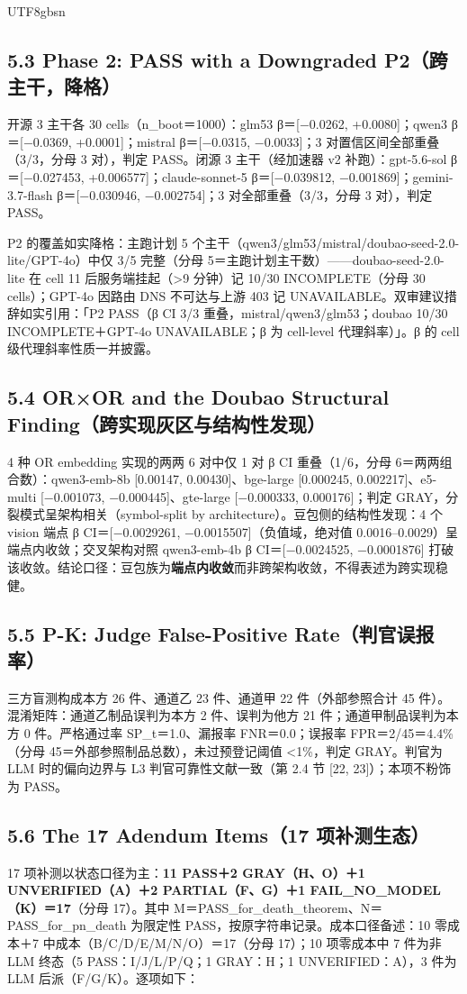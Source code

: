 \documentclass[10pt,a4paper]{article}
\begin{document}
\begin{CJK}{UTF8}{gbsn}
\subsection*{5.3 Phase 2: PASS with a Downgraded P2（跨主干，降格）}开源 3 主干各 30 cells（n\_boot＝1000）：glm53 β＝[−0.0262, +0.0080]；qwen3 β＝[−0.0369, +0.0001]；mistral β＝[−0.0315, −0.0033]；3 对置信区间全部重叠（3/3，分母 3 对），判定 PASS。闭源 3 主干（经加速器 v2 补跑）：gpt-5.6-sol β＝[−0.027453, +0.006577]；claude-sonnet-5 β＝[−0.039812, −0.001869]；gemini-3.7-flash β＝[−0.030946, −0.002754]；3 对全部重叠（3/3，分母 3 对），判定 PASS。

P2 的覆盖如实降格：主跑计划 5 个主干（qwen3/glm53/mistral/doubao-seed-2.0-lite/GPT-4o）中仅 3/5 完整（分母 5＝主跑计划主干数）——doubao-seed-2.0-lite 在 cell 11 后服务端挂起（>9 分钟）记 10/30 INCOMPLETE（分母 30 cells）；GPT-4o 因路由 DNS 不可达与上游 403 记 UNAVAILABLE。双审建议措辞如实引用：「P2 PASS（β CI 3/3 重叠，mistral/qwen3/glm53；doubao 10/30 INCOMPLETE＋GPT-4o UNAVAILABLE；β 为 cell-level 代理斜率）」。β 的 cell 级代理斜率性质一并披露。

\subsection*{5.4 OR×OR and the Doubao Structural Finding（跨实现灰区与结构性发现）}4 种 OR embedding 实现的两两 6 对中仅 1 对 β CI 重叠（1/6，分母 6＝两两组合数）：qwen3-emb-8b [0.00147, 0.00430]、bge-large [0.000245, 0.002217]、e5-multi [−0.001073, −0.000445]、gte-large [−0.000333, 0.000176]；判定 GRAY，分裂模式呈架构相关（symbol-split by architecture）。豆包侧的结构性发现：4 个 vision 端点 β CI＝[−0.0029261, −0.0015507]（负值域，绝对值 0.0016–0.0029）呈端点内收敛；交叉架构对照 qwen3-emb-4b β CI＝[−0.0024525, −0.0001876] 打破该收敛。结论口径：豆包族为\textbf{端点内收敛}而非跨架构收敛，不得表述为跨实现稳健。

\subsection*{5.5 P-K: Judge False-Positive Rate（判官误报率）}三方盲测构成本方 26 件、通道乙 23 件、通道甲 22 件（外部参照合计 45 件）。混淆矩阵：通道乙制品误判为本方 2 件、误判为他方 21 件；通道甲制品误判为本方 0 件。严格通过率 SP\_t＝1.0、漏报率 FNR＝0.0；误报率 FPR＝2/45＝4.4\%（分母 45＝外部参照制品总数），未过预登记阈值 <1\%，判定 GRAY。判官为 LLM 时的偏向边界与 L3 判官可靠性文献一致（第 2.4 节 [22, 23]）；本项不粉饰为 PASS。

\subsection*{5.6 The 17 Adendum Items（17 项补测生态）}17 项补测以状态口径为主：\textbf{11 PASS＋2 GRAY（H、O）＋1 UNVERIFIED（A）＋2 PARTIAL（F、G）＋1 FAIL\_NO\_MODEL（K）＝17}（分母 17）。其中 M＝PASS\_for\_death\_theorem、N＝PASS\_for\_pn\_death 为限定性 PASS，按原字符串记录。成本口径备述：10 零成本＋7 中成本（B/C/D/E/M/N/O）＝17（分母 17）；10 项零成本中 7 件为非 LLM 终态（5 PASS：I/J/L/P/Q；1 GRAY：H；1 UNVERIFIED：A），3 件为 LLM 后派（F/G/K）。逐项如下：



\end{CJK}
\end{document}
